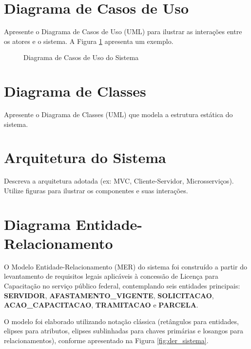\section{Diagrama de Casos de Uso}

Apresente o Diagrama de Casos de Uso (UML) para ilustrar as interações entre os atores e o sistema. A Figura \ref{fig:caso_uso} apresenta um exemplo.

\begin{figure}[htb]
\centering
\caption{Diagrama de Casos de Uso do Sistema}
\label{fig:caso_uso}
\end{figure}

\section{Diagrama de Classes}

Apresente o Diagrama de Classes (UML) que modela a estrutura estática do sistema.

\section{Arquitetura do Sistema}

Descreva a arquitetura adotada (ex: MVC, Cliente-Servidor, Microsserviços). Utilize figuras para ilustrar os componentes e suas interações.

\section{Diagrama Entidade-Relacionamento}

O Modelo Entidade-Relacionamento (MER) do sistema foi construído a partir do levantamento de requisitos legais aplicáveis à concessão de Licença para Capacitação no serviço público federal, contemplando seis entidades principais: \textbf{SERVIDOR}, \textbf{AFASTAMENTO\_VIGENTE}, \textbf{SOLICITACAO}, \textbf{ACAO\_CAPACITACAO}, \textbf{TRAMITACAO} e \textbf{PARCELA}.

O modelo foi elaborado utilizando notação clássica (retângulos para entidades, elipses para atributos, elipses sublinhadas para chaves primárias e losangos para relacionamentos), conforme apresentado na Figura \ref{fig:der_sistema}.

